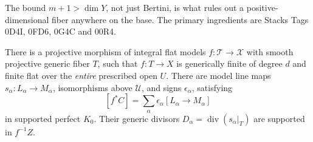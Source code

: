 The bound $m+1>\dim Y$, not just Bertini, is what rules out a
positive-dimensional fiber anywhere on the base.  The primary
ingredients are Stacks Tags 0D4I, 0FD6, 0G4C and 00R4.

\begin{lemma}
\label{r11p:relative-lines}
There is a projective morphism of integral flat models
$f:\mathcal T\to\mathcal X$ with smooth projective generic fiber $T$,
such that $f:T\to X$ is generically finite of degree $d$ and finite
flat over the \emph{entire} prescribed open $U$.  There are model
line maps $s_\alpha:L_\alpha\to M_\alpha$, isomorphisms above
$\mathcal U$, and signs $\epsilon_\alpha$, satisfying
\[
                 [f^*C]
                   =\sum_\alpha\epsilon_\alpha[L_\alpha\to M_\alpha]
\tag{PC2}\label{r11p:supported-k-equality}
\]
in supported perfect $K_0$.  Their generic divisors
$D_\alpha=\operatorname{div}(s_\alpha|_T)$ are supported in $f^{-1}Z$.
\end{lemma}

